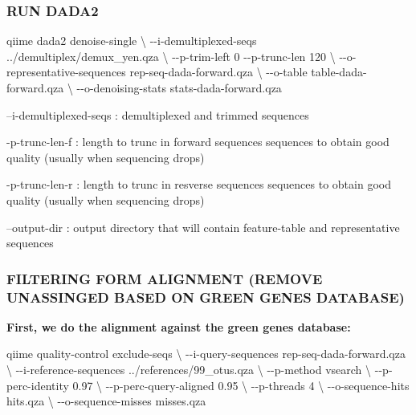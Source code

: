 \documentclass[]{interact}
\theoremstyle{plain}%
\theoremstyle{definition}
\theoremstyle{remark}
\newenvironment{Shaded}{\begin{snugshade}}{\end{snugshade}}
\newcommand{\AttributeTok}[1]{\textcolor[rgb]{0.77,0.63,0.00}{#1}}
\newcommand{\DataTypeTok}[1]{\textcolor[rgb]{0.13,0.29,0.53}{#1}}
\newcommand{\ExtensionTok}[1]{#1}
\newcommand{\NormalTok}[1]{#1}
\begin{document}
\hypertarget{run-dada2}{%
\subsubsection{RUN DADA2}\label{run-dada2}}

\begin{Shaded}
\begin{Highlighting}[]
\ExtensionTok{qiime}\NormalTok{ dada2 denoise{-}single }\DataTypeTok{\textbackslash{}}
\NormalTok{{-}{-}i{-}demultiplexed{-}seqs ../demultiplex/demux\_yen.qza }\DataTypeTok{\textbackslash{}}
\NormalTok{{-}{-}p{-}trim{-}left 0 }\AttributeTok{{-}{-}p{-}trunc{-}len}\NormalTok{ 120 }\DataTypeTok{\textbackslash{}}
\NormalTok{{-}{-}o{-}representative{-}sequences rep{-}seq{-}dada{-}forward.qza }\DataTypeTok{\textbackslash{}}
\NormalTok{{-}{-}o{-}table table{-}dada{-}forward.qza }\DataTypeTok{\textbackslash{}}
\NormalTok{{-}{-}o{-}denoising{-}stats stats{-}dada{-}forward.qza }
\end{Highlighting}
\end{Shaded}

--i-demultiplexed-seqs : demultiplexed and trimmed sequences

-p-trunc-len-f : length to trunc in forward sequences sequences to
obtain good quality (usually when sequencing drops)

-p-trunc-len-r : length to trunc in resverse sequences sequences to
obtain good quality (usually when sequencing drops)

--output-dir : output directory that will contain feature-table and
representative sequences

\hypertarget{filtering-form-alignment-remove-unassinged-based-on-green-genes-database}{%
\subsubsection{FILTERING FORM ALIGNMENT (REMOVE UNASSINGED BASED ON
GREEN GENES
DATABASE)}\label{filtering-form-alignment-remove-unassinged-based-on-green-genes-database}}

\textbf{First, we do the alignment against the green genes database:}

\begin{Shaded}
\begin{Highlighting}[]
\ExtensionTok{qiime}\NormalTok{ quality{-}control exclude{-}seqs }\DataTypeTok{\textbackslash{}}
\NormalTok{{-}{-}i{-}query{-}sequences rep{-}seq{-}dada{-}forward.qza }\DataTypeTok{\textbackslash{}}
\NormalTok{{-}{-}i{-}reference{-}sequences ../references/99\_otus.qza }\DataTypeTok{\textbackslash{}}
\NormalTok{{-}{-}p{-}method vsearch }\DataTypeTok{\textbackslash{}}
\NormalTok{{-}{-}p{-}perc{-}identity 0.97 }\DataTypeTok{\textbackslash{}}
\NormalTok{{-}{-}p{-}perc{-}query{-}aligned 0.95 }\DataTypeTok{\textbackslash{}}
\NormalTok{{-}{-}p{-}threads 4 }\DataTypeTok{\textbackslash{}}
\NormalTok{{-}{-}o{-}sequence{-}hits hits.qza }\DataTypeTok{\textbackslash{}}
\NormalTok{{-}{-}o{-}sequence{-}misses misses.qza}
\end{Highlighting}
\end{Shaded}
\end{document}
